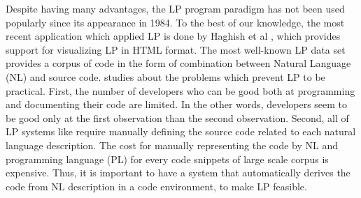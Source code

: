 Despite having many advantages, the LP program paradigm has not been used popularly since its appearance in 1984. To the best of our knowledge, the most recent application which applied LP is done by Haghish et al \cite{005}, which provides support for visualizing LP in HTML format. The most well-known LP data set \cite{006} provides a corpus of code in the form of combination between Natural Language (NL) and source code. \cite{004} studies about the problems which prevent LP to be practical. First, the number of developers who can be good both at programming and documenting their code are limited. In the other words, developers seem to be good only at the first observation than the second observation. Second, all of LP systems like \cite{006} require manually defining the source code related to each natural language description. The cost for manually representing the code by NL and programming language (PL) for every code snippets of large scale corpus is expensive. Thus, it is important to have a system that automatically derives the code from NL description in a code environment, to make LP feasible.
\\
